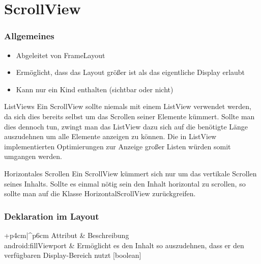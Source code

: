 \section{ScrollView}
\begin{frame}[label=scrollview]
   \frametitle{Allgemeines}
   \begin{itemize}
      \item Abgeleitet von FrameLayout 
      \item Ermöglicht, dass das Layout größer ist als das eigentliche Display erlaubt
      \item Kann nur ein Kind enthalten (sichtbar oder nicht)
   \end{itemize}

   \begin{alertblock}{ListViews}
		Ein ScrollView sollte niemals mit einem ListView verwendet werden, 
		da sich dies bereits selbst um das Scrollen seiner Elemente kümmert. 
		Sollte man dies dennoch tun, zwingt man das ListView dazu sich auf die benötigte 
		Länge auszudehnen um alle Elemente anzeigen zu können. Die in ListView 
		implementierten Optimierungen zur Anzeige großer Listen würden somit umgangen werden.
   \end{alertblock}

   \begin{alertblock}{Horizontales Scrollen}
		Ein ScrollView kümmert sich nur um das vertikale Scrollen seines Inhalts. Sollte 
		es einmal nötig sein den Inhalt horizontal zu scrollen, so sollte man auf die 
		Klasse HorizontalScrollView zurückgreifen.
   \end{alertblock}
\end{frame}

\begin{frame}
   \frametitle{Deklaration im Layout}

   \begin{attrDesc}{+p{4cm}|^p{6cm}}
      Attribut & Beschreibung\\
      \hline
      android:fillViewport & Ermöglicht es den Inhalt so auszudehnen, dass er den 
         verfügbaren Display-Bereich nutzt [boolean]\\
   \end{attrDesc}
   
   
\end{frame}

